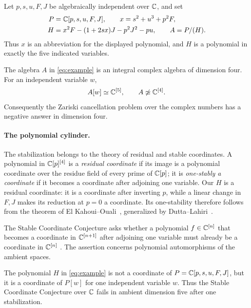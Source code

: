 Let $p,s,u,F,J$ be algebraically independent over $\mathbb C$, and set
\begin{equation}
 \begin{split}
 P&=\mathbb C[p,s,u,F,J],\qquad x=s^2+u^3+p^2F,\\
 H&=x^2F-(1+2sx)J-p^2J^2-pu,\qquad A=P/(H).
 \end{split}
 \label{eq:example}
\end{equation}
Thus $x$ is an abbreviation for the displayed polynomial, and $H$ is a
polynomial in exactly the five indicated variables.

\begin{theorem}
\label{thm:main}
The algebra $A$ in \eqref{eq:example} is an integral complex algebra of
dimension four. For an independent variable $w$,
\[
 A[w]\simeq\mathbb C^{[5]},
 \qquad
 A\not\simeq\mathbb C^{[4]}.
\]
Consequently the Zariski cancellation problem over the complex numbers has
a negative answer in dimension four.
\end{theorem}

\paragraph{The polynomial cylinder.}
The stabilization belongs to the theory of residual and stable
coordinates. A polynomial in $\mathbb C[p]^{[4]}$ is a \emph{residual
coordinate} if its image is a polynomial coordinate over the residue
field of every prime of $\mathbb C[p]$; it is \emph{one-stably a coordinate}
if it becomes a coordinate after adjoining one variable. Our $H$ is a
residual coordinate: it is a coordinate after inverting $p$, while a
linear change in $F,J$ makes its reduction at $p=0$ a coordinate.
Its one-stability therefore follows from the theorem of
El Kahoui--Ouali~\cite[Theorem~1.1]{ElKahouiOuali}, generalized by
Dutta--Lahiri~\cite[Theorem~3.4]{DuttaLahiri}.

The Stable Coordinate Conjecture asks whether a polynomial
$f\in\mathbb C^{[n]}$ that becomes a coordinate in $\mathbb C^{[n+1]}$ after
adjoining one variable must already be a coordinate in $\mathbb C^{[n]}$
\cite[p.~342]{MakarLimanovVanRossumShpilrainYu}. The assertion concerns
polynomial automorphisms of the ambient spaces.

\begin{corollary}
\label{cor:stable-coordinate}
The polynomial $H$ in \eqref{eq:example} is not a coordinate of
$P=\mathbb C[p,s,u,F,J]$, but it is a coordinate of $P[w]$ for one independent
variable $w$. Thus the Stable Coordinate Conjecture over $\mathbb C$ fails in
ambient dimension five after one stabilization.
\end{corollary}

